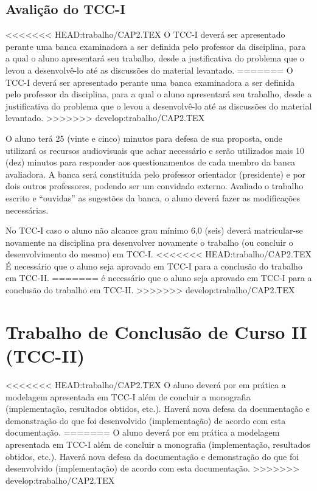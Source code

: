 \subsection{Avalição do TCC-I}

<<<<<<< HEAD:trabalho/CAP2.TEX
O TCC-I deverá ser apresentado perante uma banca examinadora a ser definida pelo professor da disciplina, para a qual o aluno apresentará seu trabalho, desde a justificativa do problema que o levou a desenvolvê-lo até as discussões do material levantado.
=======
O TCC-I deverá ser apresentado perante uma banca examinadora a ser definida pelo professor da disciplina, para a qual o aluno apresentará seu trabalho, desde a justificativa do problema que o levou a desenvolvê-lo at\'e as discussões do material levantado.
>>>>>>> develop:trabalho/CAP2.TEX

O aluno terá 25 (vinte e cinco) minutos para defesa de sua proposta, onde utilizará os recursos audiovisuais que achar necessário e serão utilizados mais 10 (dez) minutos para responder aos questionamentos de cada membro da banca avaliadora. A banca será constituída pelo professor orientador (presidente) e por dois outros professores, podendo ser um convidado externo. Avaliado o trabalho escrito e “ouvidas” as sugestões da banca, o aluno deverá fazer as modificações necessárias.

No TCC-I caso o aluno não alcance grau mínimo 6,0 (seis) deverá matricular-se novamente na disciplina pra desenvolver novamente o trabalho (ou concluir o desenvolvimento do mesmo)  em TCC-I.
<<<<<<< HEAD:trabalho/CAP2.TEX
É necessário que o aluno seja aprovado em TCC-I para a conclusão do trabalho em TCC-II. 
=======
\'e necessário que o aluno seja aprovado em TCC-I para a conclusão do trabalho em TCC-II. 
>>>>>>> develop:trabalho/CAP2.TEX


\section{Trabalho de Conclusão de Curso II (TCC-II)}

<<<<<<< HEAD:trabalho/CAP2.TEX
O aluno deverá por em prática a modelagem apresentada em TCC-I além de concluir a monografia (implementação, resultados obtidos, etc.). Haverá nova defesa da documentação e demonstração do que foi desenvolvido (implementação) de acordo com esta documentação.
=======
O aluno deverá por em prática a modelagem apresentada em TCC-I al\'em de concluir a monografia (implementação, resultados obtidos, etc.). Haverá nova defesa da documentação e demonstração do que foi desenvolvido (implementação) de acordo com esta documentação.
>>>>>>> develop:trabalho/CAP2.TEX


